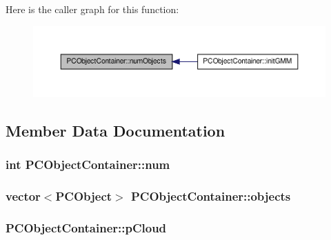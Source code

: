 \-Here is the caller graph for this function\-:
\nopagebreak
\begin{figure}[H]
\begin{center}
\leavevmode
\includegraphics[width=350pt]{class_p_c_object_container_a3028b503e5f50ee7ba14b9224cdc411d_icgraph}
\end{center}
\end{figure}




\subsection{\-Member \-Data \-Documentation}
\hypertarget{class_p_c_object_container_a59788043c1ab55a990cb05b26bf3633d}{
\subsubsection[{num}]{\setlength{\rightskip}{0pt plus 5cm}int {\bf \-P\-C\-Object\-Container\-::num}}}\label{class_p_c_object_container_a59788043c1ab55a990cb05b26bf3633d}
\hypertarget{class_p_c_object_container_a92c4994a8b244c531bc1fb3391a9631e}{
\subsubsection[{objects}]{\setlength{\rightskip}{0pt plus 5cm}vector$<${\bf \-P\-C\-Object}$>$ {\bf \-P\-C\-Object\-Container\-::objects}}}\label{class_p_c_object_container_a92c4994a8b244c531bc1fb3391a9631e}
\hypertarget{class_p_c_object_container_a9a06969ee10b3dcefccd13e76b7fa0db}{
\subsubsection[{p\-Cloud}]{ {\bf \-P\-C\-Object\-Container\-::p\-Cloud}}}\label{class_p_c_object_container_a9a06969ee10b3dcefccd13e76b7fa0db}
